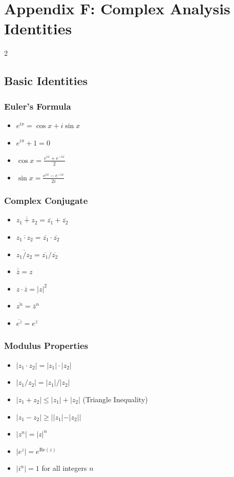 \chapter*{Appendix F: Complex Analysis Identities}
\begin{multicols}{2}
\section*{Basic Identities} 
\subsection*{Euler's Formula}
\begin{itemize}
\item $e^{ix} = \cos x + i\sin x$
\item $e^{i\pi} + 1 = 0$
\item $\cos x = \frac{e^{ix} + e^{-ix}}{2}$
\item $\sin x = \frac{e^{ix} - e^{-ix}}{2i}$
\end{itemize}
\subsection*{Complex Conjugate}
\begin{itemize}
\item $\overline{z_1 + z_2} = \overline{z_1} + \overline{z_2}$
\item $\overline{z_1 \cdot z_2} = \overline{z_1} \cdot \overline{z_2}$
\item $\overline{z_1 / z_2} = \overline{z_1} / \overline{z_2}$
\item $\overline{\overline{z}} = z$
\item $z \cdot \overline{z} = |z|^2$
\item $\overline{z^n} = \overline{z}^n$
\item $\overline{e^z} = e^{\overline{z}}$
\end{itemize}
\subsection*{Modulus Properties}
\begin{itemize}
\item $|z_1 \cdot z_2| = |z_1| \cdot |z_2|$
\item $|z_1 / z_2| = |z_1| / |z_2|$
\item $|z_1 + z_2| \leq |z_1| + |z_2|$ (Triangle Inequality)
\item $|z_1 - z_2| \geq ||z_1| - |z_2||$
\item $|z^n| = |z|^n$
\item $|e^z| = e^{\text{Re}(z)}$
\item $|i^n| = 1$ for all integers $n$
\end{itemize}

\end{multicols}
